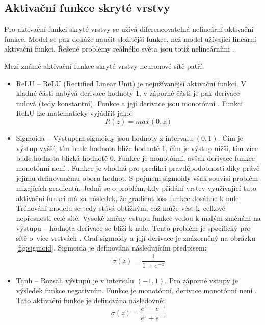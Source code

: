 \subsection*{Aktivační funkce skryté vrstvy}
Pro aktivační funkci skryté vrstvy se užívá diferencovatelná nelineární aktivační funkce. Model se pak dokáže naučit složitější funkce, než model užívající lineární aktivační funkci. Řešené problémy reálného světa jsou totiž nelineárními \cite{HowToChooseActivationFunction}. 

Mezi známé aktivační funkce skryté vrstvy neuronové sítě patří:
\begin{itemize}
    \item ReLU -- ReLU (Rectified Linear Unit) je nejužívanější aktivační funkcí. V kladné části nabývá derivace hodnoty 1, v záporné části je pak derivace nulová (tedy konstantní). Funkce a její derivace jsou monotónní \cite{ActivationFunctionsInNeuralNetworks}. Funkci ReLU lze matematicky vyjádřit jako:
    \begin{equation} 
    R(z) = max(0, z)
    \end{equation} 
    \item Sigmoida -- Výstupem sigmoidy jsou hodnoty z intervalu $(0, 1)$. Čím je výstup vyšší, tím bude hodnota blíže hodnotě 1, čím je výstup nižší, tím více bude hodnota blízká hodnotě 0. Funkce je monotónní, avšak derivace funkce monotónní není \cite{ActivationFunctionsInNeuralNetworks}. Funkce je vhodná pro predikci pravděpodobnosti díky právě jejímu definovanému oboru hodnot. S pojmem sigmoidy však souvisí problém mizejících gradientů. Jedná se o problém, kdy přidání vrstev využívající tuto aktivační funkci má za následek, že gradient loss funkce dosáhne k nule. Trénování modelu se tedy stává obtížným, což může vést k~celkové nepřesnosti celé sítě. Vysoké změny vstupu funkce vedou k malým změnám na výstupu -- hodnota derivace se blíží k nule. Tento problém je specifický pro sítě o~více vrstvách \cite{VanishingGradientProblem}. Graf sigmoidy a její derivace je znázorněný na obrázku \ref{fig:sigmoid}. Sigmoida je definována následujícím předpisem:
     \begin{equation} 
    \sigma(z) = \frac{1}{1+e^{-z}}
    \end{equation} 
    \item Tanh -- Rozsah výstupů je v intervalu $(-1, 1)$. Pro záporné vstupy je výsledek funkce negativním. Funkce je monotónní, derivace monotónní není \cite{ActivationFunctionsInNeuralNetworks}. Tato aktivační funkce je definována následovně:
       \begin{equation} 
    \sigma(z) = \frac{e^{z}-e^{-z}}{e^{z}+e^{-z}}
    \end{equation} 
\end{itemize}

